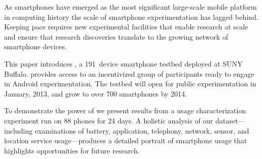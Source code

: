 As smartphones have emerged as the most significant large-scale mobile
platform in computing history the scale of smartphone experimentation has
lagged behind. Keeping pace requires new experimental facilities that enable
research at scale and ensure that research discoveries translate to the
growing network of smartphone devices.


This paper introduces \PhoneLab{}, a 191~device smartphone testbed deployed
at SUNY Buffalo. \PhoneLab{} provides access to an incentivized group of
participants ready to engage in Android experimentation. The testbed will
open for public experimentation in January, 2013, and grow to over 700
smartphones by 2014.



To demonstrate the power of \PhoneLab{} we present results from a usage
characterization experiment run on 88 phones for 24 days. A holistic analysis
of our dataset---including examinations of battery, application, telephony,
network, sensor, and location service usage---produces a detailed portrait of
smartphone usage that highlights opportunities for future research.
